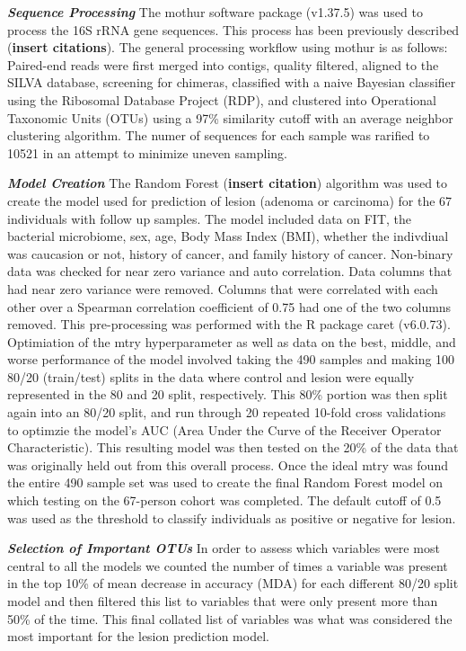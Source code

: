 \documentclass[12pt,]{article}
\begin{document}
\textbf{\emph{Sequence Processing}} The mothur software package
(v1.37.5) was used to process the 16S rRNA gene sequences. This process
has been previously described (\textbf{insert citations}). The general
processing workflow using mothur is as follows: Paired-end reads were
first merged into contigs, quality filtered, aligned to the SILVA
database, screening for chimeras, classified with a naive Bayesian
classifier using the Ribosomal Database Project (RDP), and clustered
into Operational Taxonomic Units (OTUs) using a 97\% similarity cutoff
with an average neighbor clustering algorithm. The numer of sequences
for each sample was rarified to 10521 in an attempt to minimize uneven
sampling.

\textbf{\emph{Model Creation}} The Random Forest (\textbf{insert
citation}) algorithm was used to create the model used for prediction of
lesion (adenoma or carcinoma) for the 67 individuals with follow up
samples. The model included data on FIT, the bacterial microbiome, sex,
age, Body Mass Index (BMI), whether the indivdiual was caucasion or not,
history of cancer, and family history of cancer. Non-binary data was
checked for near zero variance and auto correlation. Data columns that
had near zero variance were removed. Columns that were correlated with
each other over a Spearman correlation coefficient of 0.75 had one of
the two columns removed. This pre-processing was performed with the R
package caret (v6.0.73). Optimiation of the mtry hyperparameter as well
as data on the best, middle, and worse performance of the model involved
taking the 490 samples and making 100 80/20 (train/test) splits in the
data where control and lesion were equally represented in the 80 and 20
split, respectively. This 80\% portion was then split again into an
80/20 split, and run through 20 repeated 10-fold cross validations to
optimzie the model's AUC (Area Under the Curve of the Receiver Operator
Characteristic). This resulting model was then tested on the 20\% of the
data that was originally held out from this overall process. Once the
ideal mtry was found the entire 490 sample set was used to create the
final Random Forest model on which testing on the 67-person cohort was
completed. The default cutoff of 0.5 was used as the threshold to
classify individuals as positive or negative for lesion.

\textbf{\emph{Selection of Important OTUs}} In order to assess which
variables were most central to all the models we counted the number of
times a variable was present in the top 10\% of mean decrease in
accuracy (MDA) for each different 80/20 split model and then filtered
this list to variables that were only present more than 50\% of the
time. This final collated list of variables was what was considered the
most important for the lesion prediction model.
\end{document}

